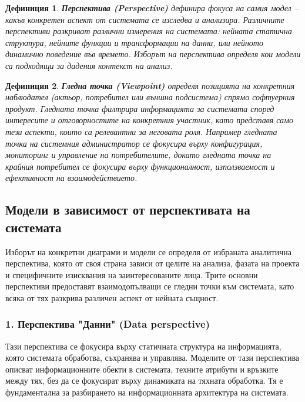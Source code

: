 \documentclass{scrartcl}
\newtheorem{definition}{Дефиниция}
\begin{document}
\begin{FlushLeft}
\begin{definition}
\textbf{Перспектива (Perspective)} дефинира фокуса на самия модел -- какъв конкретен аспект от системата се изследва и анализира. Различните перспективи разкриват различни измерения на системата: нейната статична структура, нейните функции и трансформации на данни, или нейното динамично поведение във времето. Изборът на перспектива определя кои модели са подходящи за дадения контекст на анализ.
\end{definition}

\begin{definition}
\textbf{Гледна точка (Viewpoint)} определя позицията на конкретния наблюдател (актьор, потребител или външна подсистема) спрямо софтуерния продукт. Гледната точка филтрира информацията за системата според интересите и отговорностите на конкретния участник, като представя само тези аспекти, които са релевантни за неговата роля. Например гледната точка на системния администратор се фокусира върху конфигурация, мониторинг и управление на потребителите, докато гледната точка на крайния потребител се фокусира върху функционалност, използваемост и ефективност на взаимодействието.
\end{definition}

\subsection{Модели в зависимост от перспективата на системата}

Изборът на конкретни диаграми и модели се определя от избраната аналитична перспектива, която от своя страна зависи от целите на анализа, фазата на проекта и специфичните изисквания на заинтересованите лица. Трите основни перспективи предоставят взаимодопълващи се гледни точки към системата, като всяка от тях разкрива различен аспект от нейната същност.

\subsubsection{1. Перспектива "Данни" (Data perspective)}

Тази перспектива се фокусира върху статичната структура на информацията, която системата обработва, съхранява и управлява. Моделите от тази перспектива описват информационните обекти в системата, техните атрибути и връзките между тях, без да се фокусират върху динамиката на тяхната обработка. Тя е фундаментална за разбирането на информационната архитектура на системата.


\end{FlushLeft}
\end{document}
